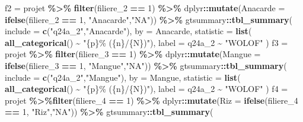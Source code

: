 \documentclass[
]{article}
\newenvironment{Shaded}{\begin{snugshade}}{\end{snugshade}}
\newcommand{\AttributeTok}[1]{\textcolor[rgb]{0.13,0.29,0.53}{#1}}
\newcommand{\DecValTok}[1]{\textcolor[rgb]{0.00,0.00,0.81}{#1}}
\newcommand{\FunctionTok}[1]{\textcolor[rgb]{0.13,0.29,0.53}{\textbf{#1}}}
\newcommand{\NormalTok}[1]{#1}
\newcommand{\OtherTok}[1]{\textcolor[rgb]{0.56,0.35,0.01}{#1}}
\newcommand{\SpecialCharTok}[1]{\textcolor[rgb]{0.81,0.36,0.00}{\textbf{#1}}}
\newcommand{\StringTok}[1]{\textcolor[rgb]{0.31,0.60,0.02}{#1}}
\begin{document}
\begin{Shaded}
\begin{Highlighting}[]
\NormalTok{f2 }\OtherTok{=}\NormalTok{ projet }\SpecialCharTok{\%\textgreater{}\%}
\FunctionTok{filter}\NormalTok{(filiere\_2 }\SpecialCharTok{==} \DecValTok{1}\NormalTok{) }\SpecialCharTok{\%\textgreater{}\%}
\NormalTok{dplyr}\SpecialCharTok{::}\FunctionTok{mutate}\NormalTok{(}\AttributeTok{Anacarde =} \FunctionTok{ifelse}\NormalTok{(filiere\_2 }\SpecialCharTok{==} \DecValTok{1}\NormalTok{, }\StringTok{"Anacarde"}\NormalTok{,}\StringTok{"NA"}\NormalTok{)) }\SpecialCharTok{\%\textgreater{}\%}
\NormalTok{gtsummary}\SpecialCharTok{::}\FunctionTok{tbl\_summary}\NormalTok{(}
\AttributeTok{include =} \FunctionTok{c}\NormalTok{(}\StringTok{"q24a\_2"}\NormalTok{,}\StringTok{"Anacarde"}\NormalTok{),}
\AttributeTok{by =}\NormalTok{ Anacarde,}
\AttributeTok{statistic =} \FunctionTok{list}\NormalTok{( }\FunctionTok{all\_categorical}\NormalTok{() }\SpecialCharTok{\textasciitilde{}} \StringTok{"\{p\}\% (\{n\}/\{N\})"}\NormalTok{),}
\AttributeTok{label =}\NormalTok{ q24a\_2 }\SpecialCharTok{\textasciitilde{}} \StringTok{"WOLOF"}
\NormalTok{)}
\NormalTok{f3 }\OtherTok{=}\NormalTok{ projet }\SpecialCharTok{\%\textgreater{}\%}
\FunctionTok{filter}\NormalTok{(filiere\_3 }\SpecialCharTok{==} \DecValTok{1}\NormalTok{) }\SpecialCharTok{\%\textgreater{}\%}
\NormalTok{dplyr}\SpecialCharTok{::}\FunctionTok{mutate}\NormalTok{(}\AttributeTok{Mangue =} \FunctionTok{ifelse}\NormalTok{(filiere\_3 }\SpecialCharTok{==} \DecValTok{1}\NormalTok{, }\StringTok{"Mangue"}\NormalTok{,}\StringTok{"NA"}\NormalTok{)) }\SpecialCharTok{\%\textgreater{}\%}
\NormalTok{gtsummary}\SpecialCharTok{::}\FunctionTok{tbl\_summary}\NormalTok{(}
\AttributeTok{include =} \FunctionTok{c}\NormalTok{(}\StringTok{"q24a\_2"}\NormalTok{,}\StringTok{"Mangue"}\NormalTok{),}
\AttributeTok{by =}\NormalTok{ Mangue,}
\AttributeTok{statistic =} \FunctionTok{list}\NormalTok{( }\FunctionTok{all\_categorical}\NormalTok{() }\SpecialCharTok{\textasciitilde{}} \StringTok{"\{p\}\% (\{n\}/\{N\})"}\NormalTok{),}
\AttributeTok{label =}\NormalTok{ q24a\_2 }\SpecialCharTok{\textasciitilde{}} \StringTok{"WOLOF"}
\NormalTok{)}
\NormalTok{f4 }\OtherTok{=}\NormalTok{ projet }\SpecialCharTok{\%\textgreater{}\%}\FunctionTok{filter}\NormalTok{(filiere\_4 }\SpecialCharTok{==} \DecValTok{1}\NormalTok{) }\SpecialCharTok{\%\textgreater{}\%}
\NormalTok{dplyr}\SpecialCharTok{::}\FunctionTok{mutate}\NormalTok{(}\AttributeTok{Riz =} \FunctionTok{ifelse}\NormalTok{(filiere\_4 }\SpecialCharTok{==} \DecValTok{1}\NormalTok{, }\StringTok{"Riz"}\NormalTok{,}\StringTok{"NA"}\NormalTok{)) }\SpecialCharTok{\%\textgreater{}\%}
\NormalTok{  gtsummary}\SpecialCharTok{::}\FunctionTok{tbl\_summary}\NormalTok{(}

\end{Highlighting}
\end{Shaded}
\end{document}
